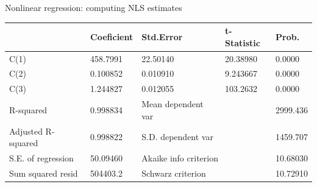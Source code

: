 \documentclass{beamer}
\begin{document}
\begin{frame}{Nonlinear regression: computing NLS estimates}
\begin{table}[]
\begin{tabular}{@{}lllll@{}}
                                                             & Coeficient                                           & Std.Error                                                    & t-Statistic                                           & Prob.                                              \\ \midrule
C(1)                                                         & 458.7991                                             & 22.50140                                                     & 20.38980                                              & 0.0000                                             \\
C(2)                                                         & 0.100852                                             & 0.010910                                                     & 9.243667                                              & 0.0000                                             \\
C(3)                                                         & 1.244827                                             & 0.012055                                                     & 103.2632                                              & 0.0000                                             \\ \midrule
R-squared                                                    & 0.998834                                             & Mean dependent var                                           &                                                       & 2999.436                                           \\
Adjusted R-squared                                           & 0.998822                                             & \multicolumn{2}{l}{S.D. dependent var}                                                                               & 1459.707                                           \\
S.E. of regression                                           & 50.09460                                             & \multicolumn{2}{l}{Akaike info criterion}                                                                            & 10.68030                                           \\
Sum squared resid                                            & 504403.2                                             & \multicolumn{2}{l}{Schwarz criterion}                                                                                & 10.72910                                           \\

\end{tabular}
\end{table}
\end{frame}
\end{document}
